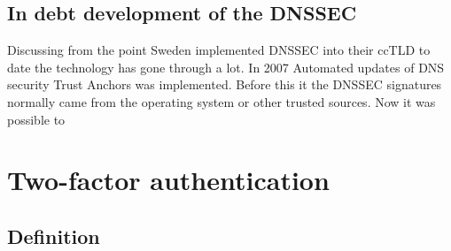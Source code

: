 \documentclass{article}
\begin{document}
		\subsection{In debt development of the DNSSEC}
		Discussing from the point Sweden implemented DNSSEC into their ccTLD to date the technology has gone through a lot. In 2007 Automated updates of DNS security Trust Anchors was implemented.\cite{trustAnchor} 
		Before this it the DNSSEC signatures normally came from the operating system or other trusted sources. Now it was possible to\cite{icann}
		
            
        
        
        
        
    
	\clearpage
	\section{Two-factor authentication}
		\subsection{Definition}
        
    \clearpage
	\nocite{*}
	
	
\end{document}
